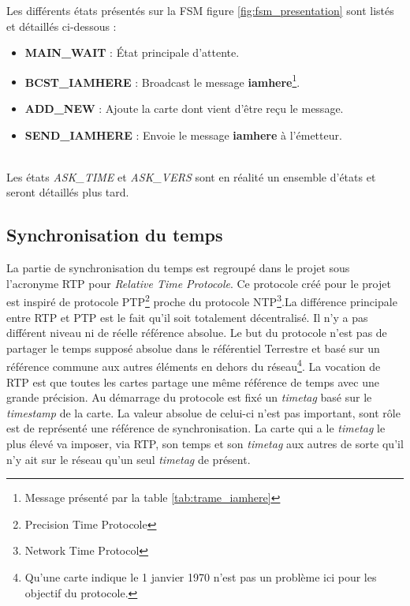 Les différents états présentés sur la FSM figure \ref{fig:fsm_presentation}  sont listés et détaillés ci-dessous :~\\
\begin{itemize}
\item \textbf{MAIN\_WAIT} : État principale d'attente.
\item \textbf{BCST\_IAMHERE} : Broadcast le message \textbf{iamhere}\footnote{Message présenté par la table \ref{tab:trame_iamhere}}.
\item \textbf{ADD\_NEW} : Ajoute la carte dont vient d'être reçu le message.
\item \textbf{SEND\_IAMHERE} : Envoie le message \textbf{iamhere} à l'émetteur.
\end{itemize}~\\
\indent Les états \textit{ASK\_TIME} et \textit{ASK\_VERS} sont en réalité un ensemble d'états et seront détaillés plus tard.

\subsection{Synchronisation du temps}
La partie de synchronisation du temps est regroupé dans le projet sous l'acronyme RTP pour \textit{Relative Time Protocole}. Ce protocole créé pour le projet est inspiré de protocole PTP\footnote{Precision Time Protocole}\citep{webpage_IntroductiontoIEEE1588_US+Department+of+Commerce}\citep{webpage_PTP1588pdf_} proche du protocole NTP\footnote{Network Time Protocol}\citep{webpage_ntporgHomeoftheNetworkTimeProtocol_}.La différence principale entre RTP et PTP est le fait qu'il soit totalement décentralisé. Il n'y a pas différent niveau ni de réelle référence absolue.\p
Le but du protocole n'est pas de partager le temps supposé absolue dans le référentiel Terrestre et basé sur un référence commune aux autres éléments en dehors du réseau\footnote{Qu'une carte indique le 1 janvier 1970 n'est pas un problème ici pour les objectif du protocole.}. La vocation de RTP est que toutes les cartes partage une même référence de temps avec une grande précision.\p
Au démarrage du protocole est fixé un \textit{timetag} basé sur le \textit{timestamp}\citep{encyclopediaArticle_Unixtime_} de la carte. La valeur absolue de celui-ci n'est pas important, sont rôle est de représenté une référence de synchronisation. La carte qui a le \textit{timetag} le plus élevé va imposer, via RTP, son temps et son \textit{timetag} aux autres de sorte qu'il n'y ait sur le réseau qu'un seul \textit{timetag} de présent.

